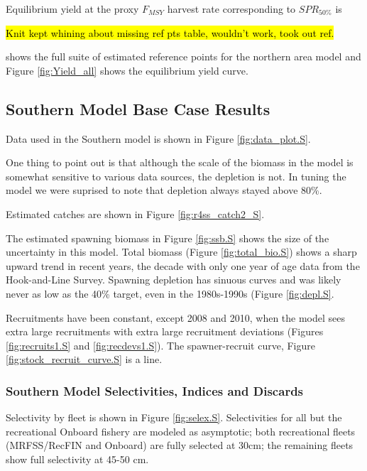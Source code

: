 \documentclass[12pt,]{article}
\begin{document}
Equilibrium yield at the proxy \(F_{MSY}\) harvest rate corresponding to
\(SPR_{50\%}\) is

\hl{Knit kept whining about missing ref pts table, wouldn't work, took out ref.}

shows the full suite of estimated reference points for the northern area
model and Figure \ref{fig:Yield_all} shows the equilibrium yield curve.

\clearpage

\subsection{Southern Model Base Case
Results}\label{southern-model-base-case-results}

Data used in the Southern model is shown in Figure
\ref{fig:data_plot.S}.

One thing to point out is that although the scale of the biomass in the
model is somewhat sensitive to various data sources, the depletion is
not. In tuning the model we were suprised to note that depletion always
stayed above 80\%.

Estimated catches are shown in Figure \ref{fig:r4ss_catch2_S}.

The estimated spawning biomass in Figure \ref{fig:ssb.S} shows the size
of the uncertainty in this model. Total biomass (Figure
\ref{fig:total_bio.S}) shows a sharp upward trend in recent years, the
decade with only one year of age data from the Hook-and-Line Survey.
Spawning depletion has sinuous curves and was likely never as low as the
40\% target, even in the 1980s-1990s (Figure \ref{fig:depl.S}.

Recruitments have been constant, except 2008 and 2010, when the model
sees extra large recruitments with extra large recruitment deviations
(Figures \ref{fig:recruits1.S} and \ref{fig:recdevs1.S}). The
spawner-recruit curve, Figure \ref{fig:stock_recruit_curve.S} is a line.

\subsubsection{Southern Model Selectivities, Indices and
Discards}\label{southern-model-selectivities-indices-and-discards}

Selectivity by fleet is shown in Figure \ref{fig:selex.S}. Selectivities
for all but the recreational Onboard fishery are modeled as asymptotic;
both recreational fleets (MRFSS/RecFIN and Onboard) are fully selected
at 30cm; the remaining fleets show full selectivity at 45-50 cm.
\end{document}
